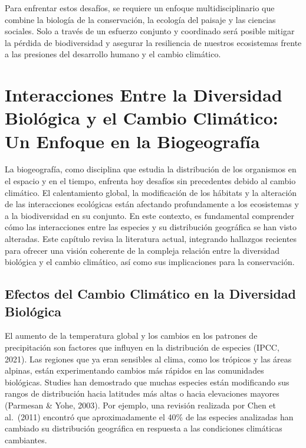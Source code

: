 \documentclass[
  letterpaper,
  DIV=11,
  numbers=noendperiod,
  oneside]{scrreprt}
\begin{document}
Para enfrentar estos desafíos, se requiere un enfoque multidisciplinario
que combine la biología de la conservación, la ecología del paisaje y
las ciencias sociales. Solo a través de un esfuerzo conjunto y
coordinado será posible mitigar la pérdida de biodiversidad y asegurar
la resiliencia de nuestros ecosistemas frente a las presiones del
desarrollo humano y el cambio climático.

\chapter{Interacciones Entre la Diversidad Biológica y el Cambio
Climático: Un Enfoque en la
Biogeografía}\label{interacciones-entre-la-diversidad-bioluxf3gica-y-el-cambio-climuxe1tico-un-enfoque-en-la-biogeografuxeda}

La biogeografía, como disciplina que estudia la distribución de los
organismos en el espacio y en el tiempo, enfrenta hoy desafíos sin
precedentes debido al cambio climático. El calentamiento global, la
modificación de los hábitats y la alteración de las interacciones
ecológicas están afectando profundamente a los ecosistemas y a la
biodiversidad en su conjunto. En este contexto, es fundamental
comprender cómo las interacciones entre las especies y su distribución
geográfica se han visto alteradas. Este capítulo revisa la literatura
actual, integrando hallazgos recientes para ofrecer una visión coherente
de la compleja relación entre la diversidad biológica y el cambio
climático, así como sus implicaciones para la conservación.

\section{Efectos del Cambio Climático en la Diversidad
Biológica}\label{efectos-del-cambio-climuxe1tico-en-la-diversidad-bioluxf3gica}

El aumento de la temperatura global y los cambios en los patrones de
precipitación son factores que influyen en la distribución de especies
(IPCC, 2021). Las regiones que ya eran sensibles al clima, como los
trópicos y las áreas alpinas, están experimentando cambios más rápidos
en las comunidades biológicas. Studies han demostrado que muchas
especies están modificando sus rangos de distribución hacia latitudes
más altas o hacia elevaciones mayores (Parmesan \& Yohe, 2003). Por
ejemplo, una revisión realizada por Chen et al.~(2011) encontró que
aproximadamente el 40\% de las especies analizadas han cambiado su
distribución geográfica en respuesta a las condiciones climáticas
cambiantes.
\end{document}
